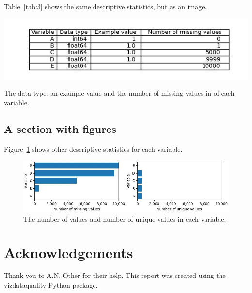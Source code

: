 \documentclass{article}
\begin{document}
Table~\ref{tab:3} shows the same descriptive statistics, but as an image.

\begin{table}[h!]
  \includegraphics[width=\linewidth]{table_desc_stats.jpg}
  \caption{The data type, an example value and the number of missing values in of each variable.}
  \label{tab:3}
\end{table}

\subsection{A section with figures}

Figure~\ref{fig:1} shows other descriptive statistics for each variable.

\begin{figure}[h!]
  \includegraphics[width=\linewidth]{fig_desc_stats.jpg}
  \caption{The number of values and number of unique values in each variable.}
  \label{fig:1}
\end{figure}

\section{Acknowledgements}

Thank you to A.N. Other for their help. This report was created using the vizdataquality Python package.
\end{document}
